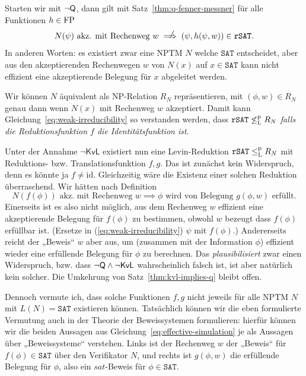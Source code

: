 Starten wir mit $\neg\mathsf{Q}$, dann gilt mit Satz~\ref{thm:q-fenner-messner} für alle Funktionen $h\in\mathrm{FP}$
\begin{equation} N(\psi) \text{ akz. mit Rechenweg $w$} \rlap{\hspace*{2pt}\raisebox{2.3pt}{$\quad\not$}}\implies  (\psi, h(\psi, w))\in\mathtt{rSAT}.\label{eq:weak-irreducibility} \end{equation}
In anderen Worten: es existiert zwar eine NPTM $N$ welche $\mathtt{SAT}$ entscheidet, aber aus den akzeptierenden Rechenwegen $w$ von $N(x)$ auf $x\in \mathtt{SAT}$ kann nicht effizient eine akzeptierende Belegung für $x$ abgeleitet werden.

Wir können $N$ äquivalent als NP-Relation $R_N$ repräsentieren, mit $(\phi, w) \in R_N$ genau dann wenn $N(x)$ mit Rechenweg $w$ akzeptiert.
Damit kann Gleichung~\ref{eq:weak-irreducibility} so verstanden werden, dass $\mathtt{rSAT} \not\leq_\mathrm{L}^\mathrm{p} R_N$ \emph{falls die Reduktionsfunktion $f$ die Identitätsfunktion ist}.

Unter der Annahme $\neg\mathsf{KvL}$ existiert nun eine Levin-Reduktion $\mathtt{rSAT}\leq_\mathrm{L}^\mathrm{p} R_N$ mit Reduktions- bzw. Translationsfunktion $f,g$. Das ist zunächst kein Widerspruch, denn es könnte ja $f\neq\mathrm{id}$.
%
%
Gleichzeitig wäre die Existenz einer solchen Reduktion überraschend. Wir hätten nach Definition
\begin{equation}\label{eq:effective-simulation} N(f(\phi)) \text{ akz. mit Rechenweg $w$} \implies \phi \text{ wird von Belegung $g(\phi, w)$ erfüllt}. \end{equation}
Einerseits ist es also nicht möglich, aus dem Rechenweg $w$ effizient eine akzeptierende Belegung für $f(\phi)$ zu bestimmen, obwohl $w$ bezeugt dass $f(\phi)$ erfüllbar ist. (Ersetze in (\ref{eq:weak-irreducibility}) $\psi$ mit $f(\phi)$.)
Andererseits reicht der „Beweis“ $w$ aber aus, um (zusammen mit der Information $\phi$) effizient wieder eine erfüllende Belegung für $\phi$ zu berechnen. 
Das \emph{plausibilisiert} zwar einen Widerspruch, bzw. dass $\neg\mathsf{Q}\land\neg\mathsf{KvL}$ wahrscheinlich falsch ist, ist aber natürlich kein solcher. Die Umkehrung von Satz~\ref{thm:kvl-implies-q} bleibt offen.

Dennoch vermute ich, dass solche Funktionen $f,g$ nicht jeweils für alle NPTM $N$ mit $L(N)=\mathtt{SAT}$ existieren können.
Tatsächlich können wir die eben formulierte Vermutung auch in der Theorie der Beweissystemen formulieren: hierfür können wir die beiden Aussagen aus Gleichung~\ref{eq:effective-simulation} je als Aussagen über „Beweissysteme“ verstehen. Links ist der Rechenweg $w$ der „Beweis“ für $f(\phi)\in \mathtt{SAT}$ über den Verifikator $N$, und rechts ist $g(\phi, w)$ die erfüllende Belegung für $\phi$, also ein $\mathit{sat}$-Beweis für $\phi\in\mathtt{SAT}$.

